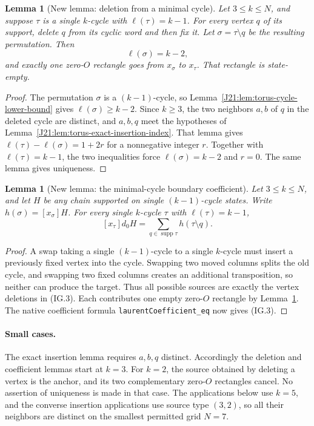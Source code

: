 \documentclass[11pt,oneside]{report}
\newtheorem{lemma}[theorem]{Lemma}
\theoremstyle{definition}
\numberwithin{equation}{section}
\newcommand{\decl}[1]{\textnormal{\nolinkurl{#1}}}
\begin{document}
\begin{lemma}[New lemma: deletion from a minimal cycle]
\label{J21:lem:torus-minimal-cycle-deletion}
Let $3\leq k\leq N$, and suppose $\tau$ is a single $k$-cycle
with $\ell(\tau)=k-1$. For every vertex $q$ of its support, delete
$q$ from its cyclic word and then fix it. Let $\sigma=\tau\setminus q$
be the resulting permutation. Then
\[
                              \ell(\sigma)=k-2,
\]
and exactly one zero-$O$ rectangle goes from $x_\sigma$ to
$x_\tau$. That rectangle is state-empty.
\end{lemma}
\begin{proof}
The permutation $\sigma$ is a $(k-1)$-cycle, so
Lemma~\ref{J21:lem:torus-cycle-lower-bound} gives $\ell(\sigma)\geq k-2$.
Since $k\geq3$, the two neighbors $a,b$ of $q$ in the deleted
cycle are distinct, and $a,b,q$ meet the hypotheses of
Lemma~\ref{J21:lem:torus-exact-insertion-index}.
That lemma gives
$\ell(\tau)-\ell(\sigma)=1+2r$ for a nonnegative integer $r$.
Together with $\ell(\tau)=k-1$, the two inequalities force
$\ell(\sigma)=k-2$ and $r=0$. The same lemma gives uniqueness.
\end{proof}

\begin{lemma}[New lemma: the minimal-cycle boundary coefficient]
\label{J21:lem:torus-minimal-cycle-coefficient}
Let $3\leq k\leq N$, and let $H$ be any chain supported on
single $(k-1)$-cycle states. Write $h(\sigma)=[x_\sigma]H$.
For every single $k$-cycle $\tau$ with $\ell(\tau)=k-1$,
\[
             [x_\tau]d_0H
                  =\sum_{q\in\operatorname{supp}\tau}h(\tau\setminus q).
 \tag{IG.3}
\]
\end{lemma}
\begin{proof}
A swap taking a single $(k-1)$-cycle to a single $k$-cycle must
insert a previously fixed vertex into the cycle.
Swapping two moved columns splits the old cycle, and swapping two
fixed columns creates an additional transposition, so neither can
produce the target.
Thus all possible sources are exactly the vertex deletions in
(IG.3). Each contributes one empty zero-$O$ rectangle by
Lemma~\ref{J21:lem:torus-minimal-cycle-deletion}.
The native coefficient formula \decl{laurentCoefficient_eq}
now gives (IG.3).
\end{proof}

\paragraph{Small cases.}
The exact insertion lemma requires $a,b,q$ distinct.
Accordingly the deletion and coefficient lemmas start at $k=3$.
For $k=2$, the source obtained by deleting a vertex is the anchor,
and its two complementary zero-$O$ rectangles cancel.
No assertion of uniqueness is made in that case.
The applications below use $k=5$, and the converse insertion
applications use source type $(3,2)$, so all their neighbors are
distinct on the smallest permitted grid $N=7$.
\end{document}
